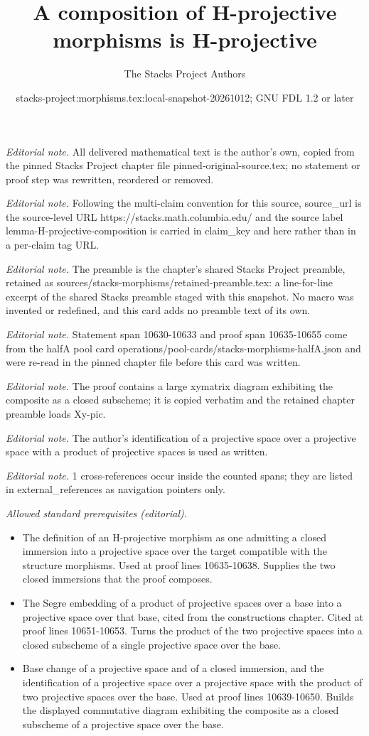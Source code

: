 \documentclass[10pt,a4paper]{amsart}
\title{A composition of H-projective morphisms is H-projective}
\author{The Stacks Project Authors}
\date{stacks-project:morphisms.tex:local-snapshot-20261012; GNU FDL 1.2 or later}
\theoremstyle{plain}
\theoremstyle{definition}
\theoremstyle{remark}
\numberwithin{equation}{subsection}
\begin{document}
\maketitle
\noindent\textit{Editorial note.} All delivered mathematical text is the author's own, copied from the pinned Stacks Project chapter file pinned-original-source.tex; no statement or proof step was rewritten, reordered or removed.\par\medskip
\noindent\textit{Editorial note.} Following the multi-claim convention for this source, source\_url is the source-level URL https://stacks.math.columbia.edu/ and the source label lemma-H-projective-composition is carried in claim\_key and here rather than in a per-claim tag URL.\par\medskip
\noindent\textit{Editorial note.} The preamble is the chapter's shared Stacks Project preamble, retained as sources/stacks-morphisms/retained-preamble.tex: a line-for-line excerpt of the shared Stacks preamble staged with this snapshot. No macro was invented or redefined, and this card adds no preamble text of its own.\par\medskip
\noindent\textit{Editorial note.} Statement span 10630-10633 and proof span 10635-10655 come from the halfA pool card operations/pool-cards/stacks-morphisms-halfA.json and were re-read in the pinned chapter file before this card was written.\par\medskip
\noindent\textit{Editorial note.} The proof contains a large xymatrix diagram exhibiting the composite as a closed subscheme; it is copied verbatim and the retained chapter preamble loads Xy-pic.\par\medskip
\noindent\textit{Editorial note.} The author's identification of a projective space over a projective space with a product of projective spaces is used as written.\par\medskip
\noindent\textit{Editorial note.} 1 cross-references occur inside the counted spans; they are listed in external\_references as navigation pointers only.\par\medskip
\noindent\textit{Allowed standard prerequisites (editorial).}\begin{itemize}
\item The definition of an H-projective morphism as one admitting a closed immersion into a projective space over the target compatible with the structure morphisms. Used at proof lines 10635-10638. Supplies the two closed immersions that the proof composes.
\item The Segre embedding of a product of projective spaces over a base into a projective space over that base, cited from the constructions chapter. Cited at proof lines 10651-10653. Turns the product of the two projective spaces into a closed subscheme of a single projective space over the base.
\item Base change of a projective space and of a closed immersion, and the identification of a projective space over a projective space with the product of two projective spaces over the base. Used at proof lines 10639-10650. Builds the displayed commutative diagram exhibiting the composite as a closed subscheme of a projective space over the base.
\end{itemize}\medskip
\end{document}
